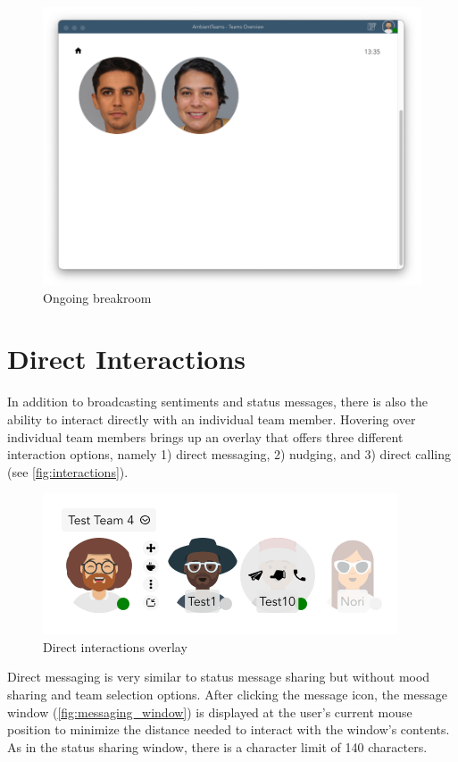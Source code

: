 \begin{figure}[h]
    \centering
    \includegraphics[width=.8\linewidth]{./images/breakroom.png}
    \caption{Ongoing breakroom}
    \label{fig:breakroom}
\end{figure}

\section{Direct Interactions}
In addition to broadcasting sentiments and status messages, there is also the ability to interact directly with an individual team member. Hovering over individual team members brings up an overlay that offers three different interaction options, namely 1) direct messaging, 2) nudging, and 3) direct calling (see \autoref{fig:interactions}).

\begin{figure}[h]
    \centering
    \includegraphics[width=.4\linewidth]{./images/interactions.png}
    \caption{Direct interactions overlay }
    \label{fig:interactions}
\end{figure}

Direct messaging is very similar to status message sharing but without mood sharing and team selection options. After clicking the message icon, the message window (\autoref{fig:messaging_window}) is displayed at the user's current mouse position to minimize the distance needed to interact with the window's contents. As in the status sharing window, there is a character limit of 140 characters.

